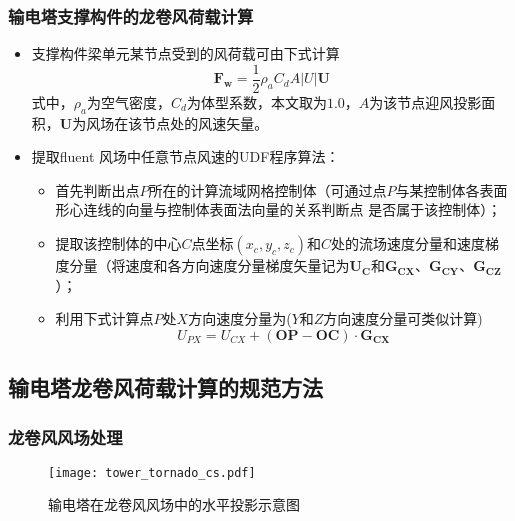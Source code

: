 \begin{frame}
  \frametitle{输电塔支撑构件的龙卷风荷载计算}
  \begin{itemize}
    \item 支撑构件梁单元某节点受到的风荷载可由下式计算
      \begin{equation}
        \bm{F_w} = \frac{1}{2} \rho_a C_d A |U| \bm{U}
      \end{equation}
      式中，$\rho_a$为空气密度，$C_d$为体型系数，本文取为$1.0$，$A$为该节点迎风投影面积，$\bm{U}$为风场在该节点处的风速矢量。
      
      \bigskip
    \item 提取fluent 风场中任意节点风速的UDF程序算法：
      \begin{itemize}
      \item
	      首先判断出点$P$所在的计算流域网格控制体（可通过点$P$与某控制体各表面形心连线的向量与控制体表面法向量的关系判断点 是否属于该控制体）；
      \item
	      提取该控制体的中心$C$点坐标$(x_c, y_c, z_c)$和$C$处的流场速度分量和速度梯度分量（将速度和各方向速度分量梯度矢量记为$\bm{U_C}$和$\bm{G_{CX}}$、$\bm{G_{CY}}$、$\bm{G_{CZ}}$）；
      \item
	      利用下式计算点$P$处$X$方向速度分量为($Y$和$Z$方向速度分量可类似计算)
	      \begin{equation}
	      	U_{PX} = U_{CX} + (\bm{OP}-\bm{OC})\cdot \bm{G_{CX}}
	      \end{equation}
      \end{itemize}
    \end{itemize}
\end{frame}


\subsection{输电塔龙卷风荷载计算的规范方法}

\begin{frame}
  \frametitle{龙卷风风场处理}

  \begin{figure}[!htpb]
    \centering
    \texttt{[image: tower\_tornado\_cs.pdf]}
    \caption*{输电塔在龙卷风风场中的水平投影示意图}
    \label{fig:tower-tornado-cs}
  \end{figure}

\end{frame}

